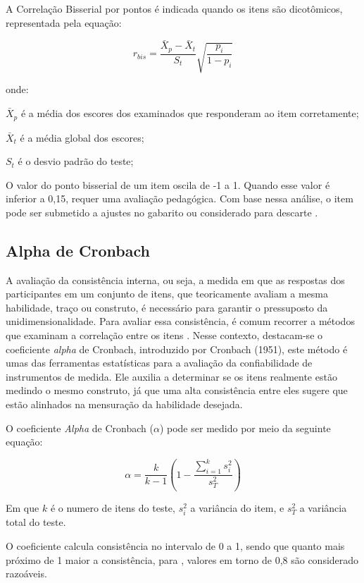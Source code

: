 A Correlação Bisserial por pontos é indicada quando os itens são dicotômicos, representada pela equação:


\begin{equation}
	r_{bis} = \frac{\bar{X}_p - \bar{X}_t}{S_t}
	\sqrt{\frac{p_i}{1 - p_i}}
\end{equation}

onde:


\noindent $ \bar{X}_p $ é a média dos escores dos examinados que responderam ao item corretamente;

\noindent $ \bar{X}_t $ é a média global dos escores;

\noindent $ S_t $ é o desvio padrão do teste;


O valor do ponto bisserial de um item oscila de -1 a 1. Quando esse valor é inferior a 0,15, requer uma avaliação pedagógica. Com base nessa análise, o item pode ser submetido a ajustes no gabarito ou considerado para descarte \cite{andrade2010uso}.


\subsection{Alpha de Cronbach}

A avaliação da consistência interna, ou seja, a medida em que as respostas dos participantes em um conjunto de itens, que teoricamente avaliam a mesma habilidade, traço ou construto, é necessário para garantir o pressuposto da unidimensionalidade. 
Para avaliar essa consistência, é comum recorrer a métodos que examinam a correlação entre os itens \cite{souza2017}. Nesse contexto, destacam-se o coeficiente \textit{alpha} de Cronbach, introduzido por Cronbach (1951), este método é umas das ferramentas estatísticas para a avaliação da confiabilidade de instrumentos de medida. Ele auxilia  a determinar se os itens realmente estão medindo o mesmo construto, já que uma alta consistência entre eles sugere que estão alinhados na mensuração da habilidade desejada.

O coeficiente \textit{Alpha} de Cronbach ($\alpha$) pode ser medido por meio da seguinte equação:

\begin{equation}
	\alpha = \frac{k}{k-1}(1 - \frac{\sum_{i=1}^{k}{s^2_i}}{s_T^2})
\end{equation}

 Em que $k$ é o numero de itens do teste, ${s_i^2}$ a variância do item, e
${s_T^2}$ a variância total do teste.

O coeficiente calcula consistência no intervalo de 0 a 1, sendo que quanto mais próximo de 1 maior a consistência, para , valores em torno de 0,8 são considerado razoáveis.

